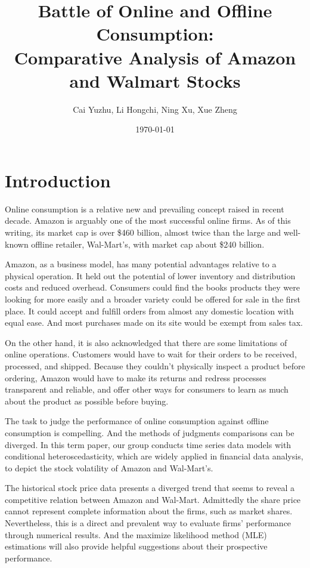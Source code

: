 \documentclass[paper=a4, fontsize=11pt]{article}
\title{
\normalfont \normalsize
\huge Battle of Online and Offline Consumption: \\
Comparative Analysis of Amazon and Walmart Stocks
}
\author{Cai Yuzhu, Li Hongchi, Ning Xu, Xue Zheng}
\date{\normalsize\today}
\begin{document}
\maketitle

\section{Introduction}
Online consumption is a relative new and prevailing concept raised in recent decade. Amazon is arguably one of the most successful online firms. As of this writing, its market cap is over \$460 billion, almost twice than the large and well-known offline retailer, Wal-Mart's, with market cap about \$240 billion.

Amazon, as a business model, has many potential advantages relative to a physical operation. It held out the potential of lower inventory and distribution costs and reduced overhead. Consumers could find the books products they were looking for more easily and a broader variety could be offered for sale in the first place. It could accept and fulfill orders from almost any domestic location with equal ease. And most purchases made on its site would be exempt from sales tax.

On the other hand, it is also acknowledged that there are some limitations of online operations. Customers would have to wait for their orders to be received, processed, and shipped. Because they couldn't physically inspect a product before ordering, Amazon would have to make its returns and redress processes transparent and reliable, and offer other ways for consumers to learn as much about the product as possible before buying.

The task to judge the performance of online consumption against offline consumption is compelling. And the methods of judgments comparisons can be diverged. In this term paper, our group conducts time series data models with conditional heteroscedasticity, which are widely applied in financial data analysis, to depict the stock volatility of Amazon and Wal-Mart's.

The historical stock price data presents a diverged trend that seems to reveal a competitive relation between Amazon and Wal-Mart. Admittedly the share price cannot represent complete information about the firms, such as market shares. Nevertheless, this is a direct and prevalent way to evaluate firms' performance through numerical results. And the maximize likelihood method (MLE) estimations will also provide helpful suggestions about their prospective performance.
\end{document}
